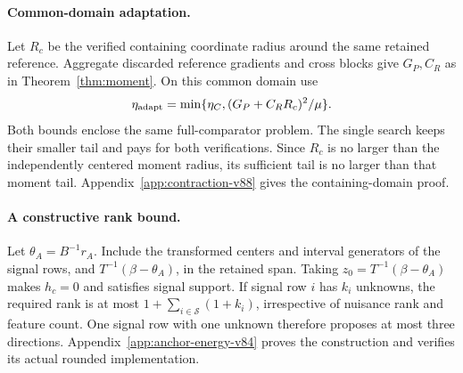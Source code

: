 \paragraph{Common-domain adaptation.}
Let $R_c$ be the verified containing coordinate radius around the same retained reference. Aggregate discarded reference gradients and cross blocks give $G_P,C_R$ as in Theorem~\ref{thm:moment}. On this common domain use
\begin{equation}
 \eta_{\rm adapt}=\min\{\eta_C,(G_P+C_RR_c)^2/\mu\}.\label{eq:adaptive-v90}
\end{equation}
Both bounds enclose the same full-comparator problem. The single search keeps their smaller tail and pays for both verifications. Since $R_c$ is no larger than the independently centered moment radius, its sufficient tail is no larger than that moment tail. Appendix~\ref{app:contraction-v88} gives the containing-domain proof.

\paragraph{A constructive rank bound.}
Let $\theta_A=B^{-1}r_A$. Include the transformed centers and interval generators of the signal rows, and $T^{-1}(\beta-\theta_A)$, in the retained span. Taking $z_0=T^{-1}(\beta-\theta_A)$ makes $h_c=0$ and satisfies signal support. If signal row $i$ has $k_i$ unknowns, the required rank is at most $1+\sum_{i\in\mathcal S}(1+k_i)$, irrespective of nuisance rank and feature count. One signal row with one unknown therefore proposes at most three directions. Appendix~\ref{app:anchor-energy-v84} proves the construction and verifies its actual rounded implementation.
